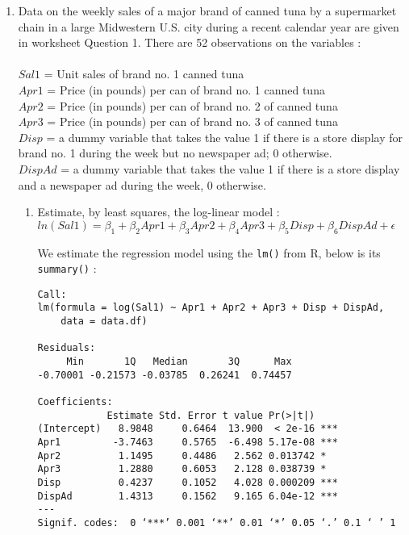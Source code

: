 \documentclass[12pt]{article}
\begin{document}
\begin{enumerate}

\item Data on the weekly sales of a major brand of canned tuna by a supermarket chain in a large Midwestern U.S. city during a recent calendar year are given in worksheet Question 1. There are 52 observations on the variables : \\ \\
$Sal1$ = Unit sales of brand no. 1 canned tuna\\
$Apr1$ = Price (in pounds) per can of brand no. 1 canned tuna\\
$Apr2$ = Price (in pounds) per can of brand no. 2 of canned tuna\\
$Apr3$ = Price (in pounds) per can of brand no. 3 of canned tuna\\
$Disp$ = a dummy variable that takes the value 1 if there is a store display for brand no. 1 during the week but no newspaper ad; 0 otherwise.\\
$DispAd$ = a dummy variable that takes the value 1 if there is a store display and a newspaper ad during the week, 0 otherwise.\\

\begin{enumerate}
\item Estimate, by least squares, the log-linear model :\\
$ln(Sal1) = \beta_1 + \beta_2 Apr1 + \beta_3 Apr2 + \beta_4 Apr3 + \beta_5 Disp + \beta_6 DispAd + \epsilon$

\begin{Answer}

We estimate the regression model using the \verb|lm()| from R, below is its \verb|summary()| :

\begin{verbatim}
Call:
lm(formula = log(Sal1) ~ Apr1 + Apr2 + Apr3 + Disp + DispAd, 
    data = data.df)

Residuals:
     Min       1Q   Median       3Q      Max 
-0.70001 -0.21573 -0.03785  0.26241  0.74457 

Coefficients:
            Estimate Std. Error t value Pr(>|t|)    
(Intercept)   8.9848     0.6464  13.900  < 2e-16 ***
Apr1         -3.7463     0.5765  -6.498 5.17e-08 ***
Apr2          1.1495     0.4486   2.562 0.013742 *  
Apr3          1.2880     0.6053   2.128 0.038739 *  
Disp          0.4237     0.1052   4.028 0.000209 ***
DispAd        1.4313     0.1562   9.165 6.04e-12 ***
---
Signif. codes:  0 ‘***’ 0.001 ‘**’ 0.01 ‘*’ 0.05 ‘.’ 0.1 ‘ ’ 1


\end{verbatim}
\end{Answer}
\end{enumerate}
\end{enumerate}
\end{document}
